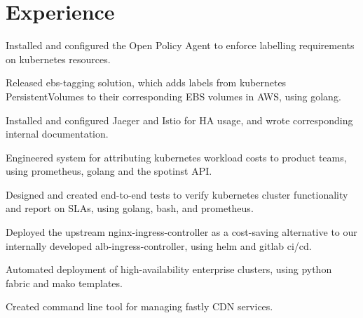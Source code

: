 \documentclass[]{deemweaver}
\begin{document}
\hfill
\begin{minipage}[t]{0.66\textwidth}


\section{Experience}
\begin{tightemize}
\vspace{\topsep} %
\item Installed and configured the Open Policy Agent to enforce labelling requirements on kubernetes resources.
\item Released ebs-tagging solution, which adds labels from kubernetes PersistentVolumes to their corresponding EBS volumes in AWS, using golang.
\item Installed and configured Jaeger and Istio for HA usage, and wrote corresponding internal documentation.
\end{tightemize}
\sectionsep

\begin{tightemize}
\vspace{\topsep} %
\item Engineered system for attributing kubernetes workload costs to product teams, using prometheus, golang and the spotinst API.
\item Designed and created end-to-end tests to verify kubernetes cluster functionality and report on SLAs, using golang, bash, and prometheus.
\item Deployed the upstream nginx-ingress-controller as a cost-saving alternative to our internally developed alb-ingress-controller, using helm and gitlab ci/cd.
\end{tightemize}
\sectionsep

\begin{tightemize}
\vspace{\topsep} %
\item Automated deployment of high-availability enterprise clusters, using python fabric and mako templates.
\item Created command line tool for managing fastly CDN services.
\end{tightemize}
\sectionsep



\end{minipage}
\end{document}
